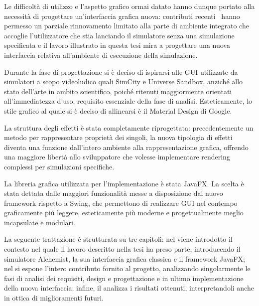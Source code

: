     Le difficoltà di utilizzo e l'aspetto grafico ormai datato hanno dunque portato alla necessità di progettare un'interfaccia grafica nuova: contributi recenti~\cite{casadio} hanno permesso un parziale rinnovamento limitato alla parte di ambiente integrato che accoglie l'utilizzatore che stia lanciando il simulatore senza una simulazione specificata e il lavoro illustrato in questa tesi mira a progettare una nuova interfaccia relativa all'ambiente di esecuzione della simulazione.

    Durante la fase di progettazione si è deciso di ispirarsi alle GUI utilizzate da simulatori a scopo videoludico quali SimCity e Universe Sandbox, anziché allo stato dell'arte in ambito scientifico, poiché ritenuti maggiormente orientati all'immediatezza d'uso, requisito essenziale della fase di analisi.
    Esteticamente, lo stile grafico al quale si è deciso di allinearsi è il Material Design di Google.

    La struttura degli effetti è stata completamente riprogettata:
    precedentemente un metodo per rappresentare proprietà dei singoli, la nuova tipologia di effetti diventa una funzione dall'intero ambiente alla rappresentazione grafica, offrendo una maggiore libertà allo sviluppatore che volesse implementare rendering complessi per simulazioni specifiche.

    La libreria grafica utilizzata per l'implementazione è stata JavaFX.
    La scelta è stata dettata dalle maggiori funzionalità messe a disposizione dal nuovo framework rispetto a Swing, che permettono di realizzare GUI nel contempo graficamente più leggere, esteticamente più moderne e progettualmente meglio incapsulate e modulari.

    \bigskip

    La seguente trattazione è strutturata su tre capitoli: nel  viene introdotto il contesto nel quale il lavoro descritto nella tesi ha preso parte, introducendo il simulatore Alchemist, la sua interfaccia grafica classica e il framework JavaFX;
    nel  si espone l'intero contributo fornito al progetto, analizzando singolarmente le fasi di analisi dei requisiti, design e progettazione e in ultimo implementazione della nuova interfaccia;
    infine, il  analizza i risultati ottenuti, interpretandoli anche in ottica di miglioramenti futuri.
